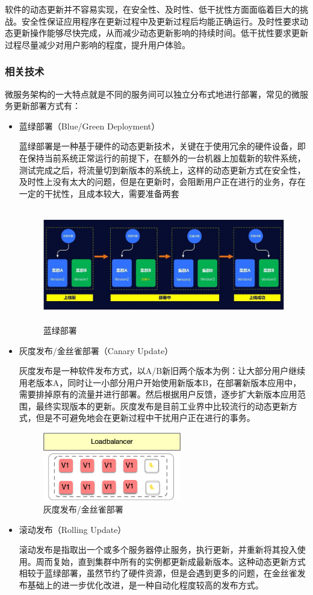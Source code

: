 \documentclass[a4paper, 12pt]{article}
\theoremstyle{definition}
\begin{document}
软件的动态更新并不容易实现，在安全性、及时性、低干扰性方面面临着巨大的挑战。安全性保证应用程序在更新过程中及更新过程后均能正确运行。及时性要求动态更新操作能够尽快完成，从而减少动态更新影响的持续时间。低干扰性要求更新过程尽量减少对用户影响的程度，提升用户体验。

\subsubsection{相关技术}
微服务架构的一大特点就是不同的服务间可以独立分布式地进行部署，常见的微服务更新部署方式有：
\begin{itemize}
	\item{蓝绿部署（Blue/Green Deployment）

	蓝绿部署是一种基于硬件的动态更新技术，关键在于使用冗余的硬件设备，即在保持当前系统正常运行的前提下，在额外的一台机器上加载新的软件系统，测试完成之后，将流量切到新版本的系统上，这样的动态更新方式在安全性，及时性上没有太大的问题，但是在更新时，会阻断用户正在进行的业务，存在一定的干扰性，且成本较大，需要准备两套}
	\begin{figure}[!ht]
	 \centering
	 \includegraphics[height=5cm]{images/blue-green.jpeg}
	 \caption{蓝绿部署}
	 \label{fig:blue-green}
	\end{figure}

	\item{灰度发布/金丝雀部署（Canary Update）

	灰度发布是一种软件发布方式，以A/B新旧两个版本为例：让大部分用户继续用老版本A，同时让一小部分用户开始使用新版本B，在部署新版本应用中，需要排掉原有的流量并进行部署。然后根据用户反馈，逐步扩大新版本应用范围，最终实现版本的更新。灰度发布是目前工业界中比较流行的动态更新方式，但是不可避免地会在更新过程中干扰用户正在进行的事务。}
	\begin{figure}[!ht]
	 \centering
	 \includegraphics[height=3cm]{images/canary.png}
	 \caption{灰度发布/金丝雀部署}
	 \label{fig:canary}
	\end{figure}

	\item{滚动发布（Rolling Update）

	滚动发布是指取出一个或多个服务器停止服务，执行更新，并重新将其投入使用。周而复始，直到集群中所有的实例都更新成最新版本。这种动态更新方式相较于蓝绿部署，虽然节约了硬件资源，但是会遇到更多的问题，在金丝雀发布基础上的进一步优化改进，是一种自动化程度较高的发布方式。}
	
\end{itemize}
\end{document}
